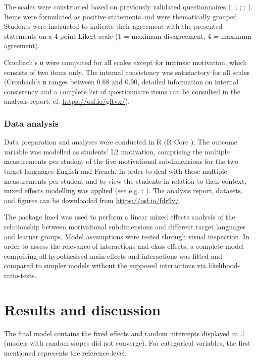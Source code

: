 \documentclass[output=paper]{langsci/langscibook}
\begin{document}
The scales were constructed based on previously validated questionnaires (\citealt{HorwitzEtAl1986}; \citealt{Stoeckli2004}; \citealt{Doernyei2010}; \citealt{Heinzmann2013}; \citealt{PeyerEtAl2016}). Items were formulated as positive statements and were thematically grouped. Students were instructed to indicate their agreement with the presented statements on a 4-point Likert scale (1 = maximum disagreement, 4 = maximum agreement). 

Cronbach’s α were computed for all scales except for intrinsic motivation, which consists of two items only. The internal consistency was satisfactory for all scales (Cronbach’s α ranges between 0.68 and 0.90, detailed information on internal consistency and a complete list of questionnaire items can be consulted in the analysis report, cf. \url{https://osf.io/gftvx/}).


\subsubsection{Data analysis}


Data preparation and analyses were conducted in R (R Core \citealt{Team2019}). The outcome variable was modelled as students’ L2 motivation, comprising the multiple measurements per student of the five motivational subdimensions for the two target languages English and French. In order to deal with these multiple measurements per student and to view the students in relation to their context, mixed effects modelling was applied (see e.g. \citealt{BaayenEtAl2008}; \citealt{PfenningerSingleton2016}). The analysis report, datasets, and figures can be downloaded from \url{https://osf.io/fdr9v/}.

The package lme4 \citep{BatesEtAl2015} was used to perform a linear mixed effects analysis of the relationship between motivational subdimensions and different target languages and learner groups. Model assumptions were tested through visual inspection. In order to assess the relevance of interactions and class effects, a complete model comprising all hypothesised main effects and interactions was fitted and compared to simpler models without the supposed interactions via likelihood-ratio-tests. 

\section{Results and discussion}

The final model contains the fixed effects and random intercepts displayed in .1 (models with random slopes did not converge). For categorical variables, the first mentioned represents the reference level.
\end{document}
